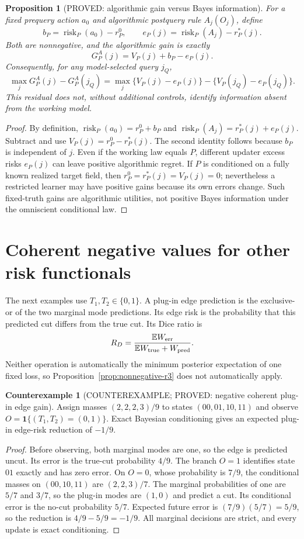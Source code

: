 \documentclass[11pt]{article}
\newtheorem{proposition}[theorem]{Proposition}
\theoremstyle{definition}
\newtheorem{counterexample}[theorem]{Counterexample}
\theoremstyle{remark}
\begin{document}
\begin{proposition}[PROVED: algorithmic gain versus Bayes information]
\label{prop:updater-decomposition-r3}
For a fixed prequery action $a_0$ and algorithmic postquery rule
$A_j(O_j)$, define
\[
 b_P=\operatorname{risk}_P(a_0)-r_P^0,\qquad
 e_P(j)=\operatorname{risk}_P(A_j)-r_P^*(j).
\]
Both are nonnegative, and the algorithmic gain is exactly
\[
 G_P^A(j)=V_P(j)+b_P-e_P(j).
\]
Consequently, for any model-selected query $j_Q$,
\[
 \max_jG_P^A(j)-G_P^A(j_Q)
 =\max_j\{V_P(j)-e_P(j)\}
    -\{V_P(j_Q)-e_P(j_Q)\}.
\]
This residual does not, without additional controls, identify
information absent from the working model.
\end{proposition}
\begin{proof}
By definition,
$\operatorname{risk}_P(a_0)=r_P^0+b_P$ and
$\operatorname{risk}_P(A_j)=r_P^*(j)+e_P(j)$.
Subtract and use $V_P(j)=r_P^0-r_P^*(j)$.
The second identity follows because $b_P$ is independent of $j$.
Even if the working law equals $P$, different updater excess risks
$e_P(j)$ can leave positive algorithmic regret.
If $P$ is conditioned on a fully known realized target field, then
$r_P^0=r_P^*(j)=V_P(j)=0$; nevertheless a restricted learner may have
positive gains because its own errors change. Such fixed-truth gains
are algorithmic utilities, not positive Bayes information under the
omniscient conditional law.
\end{proof}

\section{Coherent negative values for other risk functionals}

The next examples use $T_1,T_2\in\{0,1\}$.
A plug-in edge prediction is the exclusive-or of the two marginal
mode predictions. Its edge risk is the probability that this predicted
cut differs from the true cut. Its Dice ratio is
\[
 R_D=\frac{\mathbb{E}W_{\rm err}}
           {\mathbb{E}W_{\rm true}+W_{\rm pred}}.
\]
Neither operation is automatically the minimum posterior expectation
of one fixed loss, so Proposition~\ref{prop:nonnegative-r3} does not
automatically apply.

\begin{counterexample}[COUNTEREXAMPLE; PROVED: negative coherent plug-in edge gain]
Assign masses $(2,2,2,3)/9$ to states $(00,01,10,11)$ and observe
$O=\mathbf{1}\{(T_1,T_2)=(0,1)\}$. Exact Bayesian conditioning gives
an expected plug-in edge-risk reduction of $-1/9$.
\end{counterexample}
\begin{proof}
Before observing, both marginal modes are one, so the edge is predicted
uncut. Its error is the true-cut probability $4/9$.
The branch $O=1$ identifies state $01$ exactly and has zero error.
On $O=0$, whose probability is $7/9$, the conditional masses on
$(00,10,11)$ are $(2,2,3)/7$. The marginal probabilities of one are
$5/7$ and $3/7$, so the plug-in modes are $(1,0)$ and predict a cut.
Its conditional error is the no-cut probability $5/7$.
Expected future error is $(7/9)(5/7)=5/9$, so the reduction is
$4/9-5/9=-1/9$. All marginal decisions are strict, and every update
is exact conditioning.
\end{proof}
\end{document}
